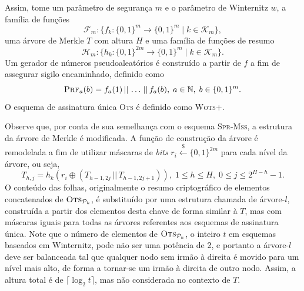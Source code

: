 \documentclass{ufsctex/ufsctex}
\newcommand{\hh}{\mathcal{H}}
\newcommand{\pk}{\mathcal{P}_k}
\newcommand{\concat}{\, \vert{} \vert{} \,}
\newcommand{\binwds}[1]{\{0, 1\}^{#1}}
\newcommand{\random}{\stackrel{\$}{\longleftarrow}}
\newcommand{\wotsplus}{\textsc{Wots+}}
\newcommand{\sprmss}{\textsc{Spr-Mss}}
\begin{document}
Assim, tome um parâmetro de segurança $m$ e o parâmetro de Winternitz $w$, a
família de funções \[\mathcal{F}_m : \{f_k : \binwds{m} \longrightarrow
\binwds{m} \mid k \in \mathcal{K}_m\},\] uma árvore de Merkle $T$ com altura
$H$ e uma família de funções de resumo \[\hh{}_m : \{h_k : \binwds{2m}
\longrightarrow \binwds{m} \mid k \in \mathcal{K}_m\}.\] Um gerador de números
pseudoaleatórios é construído a partir de $f$ a fim de assegurar
sigilo encaminhado, definido como
\begin{equation}
  \textsc{Prf}_{a}(b) = f_a(1) \concat \dots \concat f_a(b),
    \; a \in \mathbb{N}, \; b \in \binwds{m}.
\end{equation}
O esquema de assinatura única \textsc{Ots} é definido como \wotsplus{}.

Observe que, por conta de sua semelhança com o esquema \sprmss{}, a estrutura
da árvore de Merkle é modificada. A função de construção da árvore é remodelada
a fim de utilizar máscaras de \emph{bits} $r_i \random{}
\binwds{2m}$ para cada nível da árvore, ou seja,
\begin{equation}
  T_{h, j} = h_k(r_i \oplus (T_{h - 1, 2j} \concat T_{h - 1, 2j + 1})),
    \; 1 \leq h \leq H, \; 0 \leq j \leq 2^{H - h} - 1.
\end{equation}
O conteúdo das folhas, originalmente o resumo criptográfico de elementos
concatenados de $\textsc{Ots}_{\pk{}}$, é substituído por uma estrutura chamada
de árvore-$l$, construída a partir dos elementos desta chave de forma similar à
$T$, mas com máscaras iguais para todas as árvores referentes aos esquemas de
assinatura única. Note que o número de elementos de $\textsc{Ots}_{\pk{}}$, o
inteiro $t$ em esquemas baseados em Winternitz, pode não ser uma potência de 2,
e portanto a árvore-$l$ deve ser balanceada tal que qualquer nodo sem irmão à
direita é movido para um nível mais alto, de forma a tornar-se um irmão à
direita de outro nodo. Assim, a altura total é de $\lceil \log_{2} t \rceil$,
mas não considerada no contexto de $T$.
\end{document}
